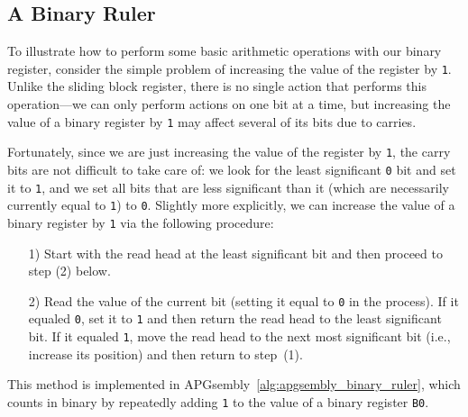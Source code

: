 \subsection{A Binary Ruler}\label{sec:binary_ruler}

To illustrate how to perform some basic arithmetic operations with our binary register, consider the simple problem of increasing the value of the register by \texttt{1}. Unlike the sliding block register, there is no single action that performs this operation---we can only perform actions on one bit at a time, but increasing the value of a binary register by \texttt{1} may affect several of its bits due to carries.

Fortunately, since we are just increasing the value of the register by \texttt{1}, the carry bits are not difficult to take care of: we look for the least significant \texttt{0} bit and set it to \texttt{1}, and we set all bits that are less significant than it (which are necessarily currently equal to \texttt{1}) to \texttt{0}. Slightly more explicitly, we can increase the value of a binary register by \texttt{1} via the following procedure:\smallskip

\begin{enumerate}
	\item[1)] Start with the read head at the least significant bit and then proceed to step (2) below.\smallskip
	
	\item[2)] Read the value of the current bit (setting it equal to \texttt{0} in the process). If it equaled \texttt{0}, set it to \texttt{1} and then return the read head to the least significant bit. If it equaled \texttt{1}, move the read head to the next most significant bit (i.e., increase its position) and then return to step~(1).\smallskip
\end{enumerate}

This method is implemented in APGsembly~\ref{alg:apgsembly_binary_ruler}, which counts in binary by repeatedly adding \texttt{1} to the value of a binary register \texttt{B0}.

